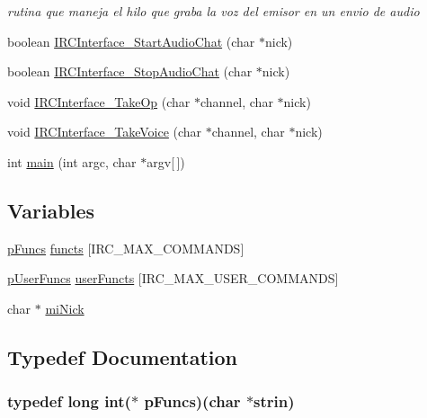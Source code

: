 \begin{DoxyCompactItemize}
\begin{DoxyCompactList}\small\item\em rutina que maneja el hilo que graba la voz del emisor en un envio de audio \end{DoxyCompactList}\item 
boolean \hyperlink{_g-2301-05-_p2-xchat2_8c_a5dc7a44587e609b416a783cd420a12e3}{I\-R\-C\-Interface\-\_\-\-Start\-Audio\-Chat} (char $\ast$nick)
\item 
boolean \hyperlink{_g-2301-05-_p2-xchat2_8c_a754a3d3dd311194637c07cc701e7d507}{I\-R\-C\-Interface\-\_\-\-Stop\-Audio\-Chat} (char $\ast$nick)
\item 
void \hyperlink{_g-2301-05-_p2-xchat2_8c_a4e2a1ea75e59306142030a91a054b7e6}{I\-R\-C\-Interface\-\_\-\-Take\-Op} (char $\ast$channel, char $\ast$nick)
\item 
void \hyperlink{_g-2301-05-_p2-xchat2_8c_a2ff2e10ed1cb1a399293b6f76ac1e5ae}{I\-R\-C\-Interface\-\_\-\-Take\-Voice} (char $\ast$channel, char $\ast$nick)
\item 
int \hyperlink{_g-2301-05-_p2-xchat2_8c_a0ddf1224851353fc92bfbff6f499fa97}{main} (int argc, char $\ast$argv\mbox{[}$\,$\mbox{]})
\end{DoxyCompactItemize}
\subsection*{Variables}
\begin{DoxyCompactItemize}
\item 
\hyperlink{servidor___i_r_c_8c_af4fbc62d68085a32b47e88d447b77b28}{p\-Funcs} \hyperlink{_g-2301-05-_p2-xchat2_8c_a3b74f15bfc2af0a575608c31e269694a}{functs} \mbox{[}I\-R\-C\-\_\-\-M\-A\-X\-\_\-\-C\-O\-M\-M\-A\-N\-D\-S\mbox{]}
\item 
\hyperlink{_g-2301-05-_p2-xchat2_8c_aa0f4db7da8ca28c8ec5521d8825a83ea}{p\-User\-Funcs} \hyperlink{_g-2301-05-_p2-xchat2_8c_abe79a286412486fd4694376263d47045}{user\-Functs} \mbox{[}I\-R\-C\-\_\-\-M\-A\-X\-\_\-\-U\-S\-E\-R\-\_\-\-C\-O\-M\-M\-A\-N\-D\-S\mbox{]}
\item 
char $\ast$ \hyperlink{_g-2301-05-_p2-xchat2_8c_a07a8da7c5d9e4cce3c271c1907be47fe}{mi\-Nick}
\end{DoxyCompactItemize}


\subsection{Typedef Documentation}
\hypertarget{_g-2301-05-_p2-xchat2_8c_a4b932f95396d02e0a0c48dfab971852a}{
\subsubsection[{p\-Funcs}]{\setlength{\rightskip}{0pt plus 5cm}typedef long int($\ast$ p\-Funcs)(char $\ast$strin)}}\label{_g-2301-05-_p2-xchat2_8c_a4b932f95396d02e0a0c48dfab971852a}


